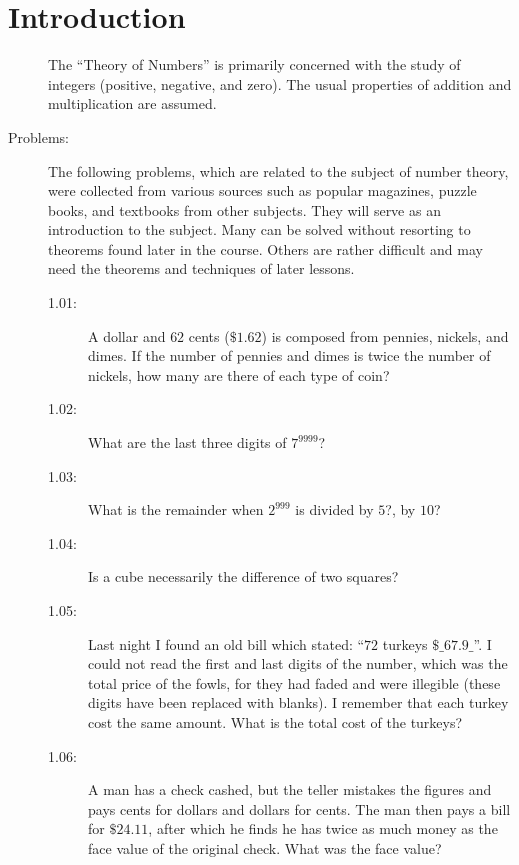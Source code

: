 \documentclass{article}
\begin{document}
\newpage


\section{Introduction}


\begin{description}

  \item[] The ``Theory of Numbers'' is primarily concerned with the study of integers (positive, negative, and zero). The usual properties of addition and multiplication are assumed.

  \item[Problems:] The following problems, which are related to the subject of number theory, were collected from various sources such as popular magazines, puzzle books, and textbooks from other subjects. They will serve as an introduction to the subject. Many can be solved without resorting to theorems found later in the course. Others are rather difficult and may need the theorems and techniques of later lessons.
    \begin{description}
      \item[1.01:] A dollar and $62$ cents ($\mathdollar 1.62$) is composed from pennies, nickels, and dimes. If the number of pennies and dimes is twice the number of nickels, how many are there of each type of coin?
      \item[1.02:] What are the last three digits of $7^{9999}$?
      \item[1.03:] What is the remainder when $2^{999}$ is divided by $5$?, by $10$?
      \item[1.04:] Is a cube necessarily the difference of two squares?
      \item[1.05:] Last night I found an old bill which stated: ``$72$ turkeys $\mathdollar \_67.9\_$''. I could not read the first and last digits of the number, which was the total price of the fowls, for they had faded and were illegible (these digits have been replaced with blanks). I remember that each turkey cost the same amount. What is the total cost of the turkeys?
      \item[1.06:] A man has a check cashed, but the teller mistakes the figures and pays cents for dollars and dollars for cents. The man then pays a bill for $\mathdollar 24.11$, after which he finds he has twice as much money as the face value of the original check. What was the face value?

\end{description}
\end{description}
\end{document}
